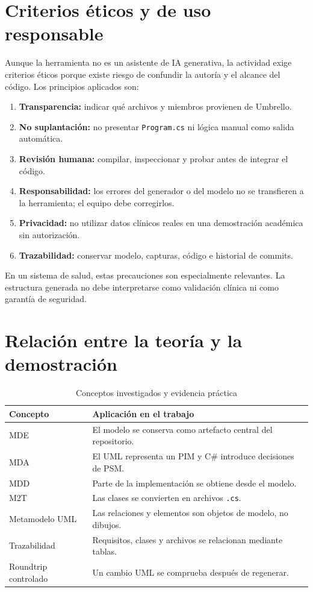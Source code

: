 \section{Criterios éticos y de uso responsable}
Aunque la herramienta no es un asistente de IA generativa, la actividad exige criterios éticos porque existe riesgo de confundir la autoría y el alcance del código. Los principios aplicados son:
\begin{enumerate}
  \item \textbf{Transparencia:} indicar qué archivos y miembros provienen de Umbrello.
  \item \textbf{No suplantación:} no presentar \texttt{Program.cs} ni lógica manual como salida automática.
  \item \textbf{Revisión humana:} compilar, inspeccionar y probar antes de integrar el código.
  \item \textbf{Responsabilidad:} los errores del generador o del modelo no se transfieren a la herramienta; el equipo debe corregirlos.
  \item \textbf{Privacidad:} no utilizar datos clínicos reales en una demostración académica sin autorización.
  \item \textbf{Trazabilidad:} conservar modelo, capturas, código e historial de commits.
\end{enumerate}

En un sistema de salud, estas precauciones son especialmente relevantes. La estructura generada no debe interpretarse como validación clínica ni como garantía de seguridad.

\section{Relación entre la teoría y la demostración}
\begin{table}[H]
\centering
\caption{Conceptos investigados y evidencia práctica}
\begin{tabularx}{\textwidth}{L{4cm}X}
\toprule
\textbf{Concepto} & \textbf{Aplicación en el trabajo} \\
\midrule
MDE & El modelo se conserva como artefacto central del repositorio. \\
MDA & El UML representa un PIM y C\# introduce decisiones de PSM. \\
MDD & Parte de la implementación se obtiene desde el modelo. \\
M2T & Las clases se convierten en archivos \texttt{.cs}. \\
Metamodelo UML & Las relaciones y elementos son objetos de modelo, no dibujos. \\
Trazabilidad & Requisitos, clases y archivos se relacionan mediante tablas. \\
Roundtrip controlado & Un cambio UML se comprueba después de regenerar. \\
\bottomrule
\end{tabularx}
\end{table}

